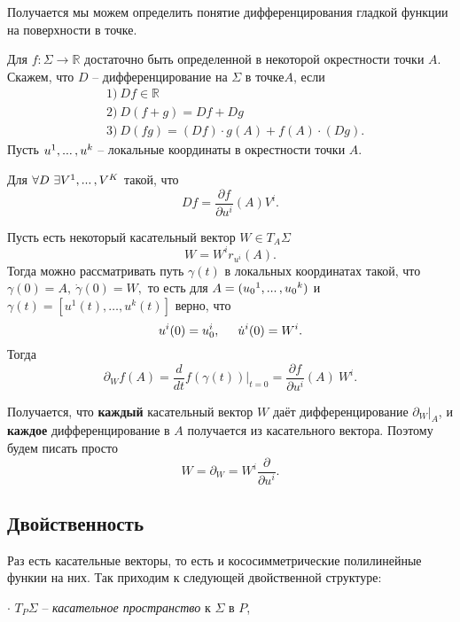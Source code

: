 Получается мы можем определить понятие  дифференцирования гладкой функции на поверхности в точке.

\begin{to_def} 
     Для $f\colon \Sigma \to \mathbb{R}$ достаточно быть определенной в некоторой окрестности точки $A$. Скажем, что $D$ -- дифференцирование на $\Sigma$ в точке$A$, если
    \begin{align*}
        &1) \ Df \in \mathbb{R} \\
        &2) \ D(f+g) = Df + Dg \\
        &3) \ D(fg) = (Df) \cdot g(A) + f(A) \cdot (Dg).
    \end{align*}
    Пусть ${u}^{1}, ... \,, {u}^{k}$ -- локальные координаты в окрестности точки $A$.
\end{to_def}


\begin{to_lem} 
     Для $\forall D \ \exists {V}^{1}, ... \,, {V}^{K}$ такой, что
     $$
         Df = \frac{\partial f}{\partial u^i} (A) V^i.
     $$
\end{to_lem}

Пусть есть некоторый касательный вектор $W \in T_A \Sigma$
$$
    W = W^i r_{u^i} (A).
$$
Тогда можно рассматривать путь $\gamma(t)$ в локальных координатах такой, что
$
    \gamma(0) = A, \ \dot{\gamma}(0) = W,
$
то есть для $A = ({u_0}^{1}, ... \,, {u_0}^{k})$ и $\gamma(t) = \left[
    u^1(t), \ldots, u^k(t)
\right]$ верно, что
$$
    u^i(0) = u^i_0, \hspace{0.5cm} \dot{u}^i(0) = W^i.
$$
Тогда
$$
    \partial_W f(A) = \frac{d}{dt} f(\gamma(t)) \bigg|_{t=0}
    =
    \frac{\partial f}{\partial u^i} (A) \ W^i.
$$

Получается, что \textbf{каждый} касательный вектор $W$ даёт дифференцирование $\partial_W \big|_A$, и \textbf{каждое} дифференцирование в $A$ получается из касательного вектора. Поэтому будем писать просто
\begin{equation}
    \boxed{
    W = \partial_W = W^i \frac{\partial }{\partial u^i} .
    }
\end{equation}


\subsection{Двойственность}

Раз есть касательные векторы, то есть и кососимметрические полилинейные функии на них. 
Так приходим к следующей двойственной структуре:

$\cdot$ $T_P \Sigma$ -- \textit{касательное пространство} к $\Sigma$ в $P$,

